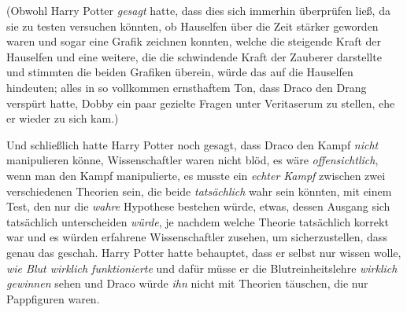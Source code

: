 (Obwohl Harry Potter \emph{gesagt} hatte, dass dies sich immerhin überprüfen ließ, da sie zu testen versuchen könnten, ob Hauselfen über die Zeit stärker geworden waren und sogar eine Grafik zeichnen konnten, welche die steigende Kraft der Hauselfen und eine weitere, die die schwindende Kraft der Zauberer darstellte und stimmten die beiden Grafiken überein, würde das auf die Hauselfen hindeuten; alles in so vollkommen ernsthaftem Ton, dass Draco den Drang verspürt hatte, Dobby ein paar gezielte Fragen unter Veritaserum zu stellen, ehe er wieder zu sich kam.)

Und schließlich hatte Harry Potter noch gesagt, dass Draco den Kampf \emph{nicht} manipulieren könne, Wissenschaftler waren nicht blöd, es wäre \emph{offensichtlich}, wenn man den Kampf manipulierte, es musste ein \emph{echter Kampf} zwischen zwei verschiedenen Theorien sein, die beide \emph{tatsächlich} wahr sein könnten, mit einem Test, den nur die \emph{wahre} Hypothese bestehen würde, etwas, dessen Ausgang sich tatsächlich unterscheiden \emph{würde}, je nachdem welche Theorie tatsächlich korrekt war und es würden erfahrene Wissenschaftler zusehen, um sicherzustellen, dass genau das geschah. Harry Potter hatte behauptet, dass er selbst nur wissen wolle, \emph{wie Blut wirklich funktionierte} und dafür müsse er die Blutreinheitslehre \emph{wirklich} \emph{gewinnen} sehen und Draco würde \emph{ihn} nicht mit Theorien täuschen, die nur Pappfiguren waren.

